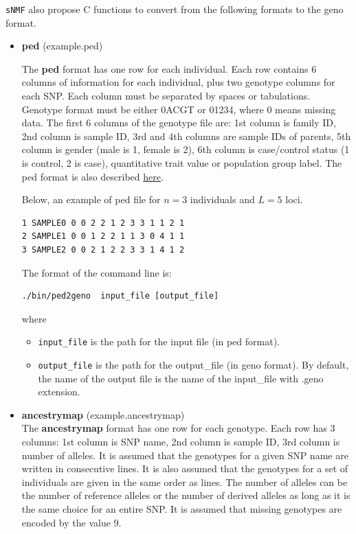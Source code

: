 \documentclass[10pt,a4paper]{article}
\begin{document}
\noindent
{\tt sNMF} also propose C functions to convert from the following formats to the geno format.
\begin{itemize}
\item {\bf ped} (example.ped)

The {\bf ped} format has one row for each individual. Each row contains 6 columns of information for each individual, plus two genotype columns for each SNP. Each column must be separated by spaces or tabulations. Genotype format must be either 0ACGT or 01234, where 0 means missing data. The first 6 columns of the genotype file are: 1st column is family ID, 2nd column is sample ID, 3rd and 4th columns are sample IDs of parents, 5th column is gender (male is 1, female is 2), 6th column is case/control status (1 is control, 2 is case), quantitative trait value or population group label. 
The ped format is also described \href{http://pngu.mgh.harvard.edu/~purcell/plink/data.shtml#ped}{here}.

Below, an example of ped file for $n=3$ individuals and $L=5$ loci.
\begin{center}
\footnotesize
\begin{Verbatim}[frame=single]
1 SAMPLE0 0 0 2 2 1 2 3 3 1 1 2 1
2 SAMPLE1 0 0 1 2 2 1 1 3 0 4 1 1
3 SAMPLE2 0 0 2 1 2 2 3 3 1 4 1 2
\end{Verbatim}
\end{center}

The format of the command line is:
\begin{Verbatim}[frame=single]
./bin/ped2geno  input_file [output_file]
\end{Verbatim}
where 
\begin{itemize}
\item \verb|input_file| is the path for the input file (in ped format).
\item \verb|output_file| is the path for the output\_file (in geno format). 
By default, the name of the output file is the name of the input\_file with .geno extension.

\end{itemize}

\item {\bf ancestrymap} (example.ancestrymap)\\
The {\bf ancestrymap} format has one row for each genotype. Each row has 3 columns: 1st column is SNP name, 2nd column is sample ID, 3rd column is number of alleles. It is assumed that the genotypes for a given SNP name are written in consecutive lines. It is also assumed that the genotypes for a set of individuals are given in the same order as lines. The number of alleles can be the number of reference alleles or the number of derived alleles as long as it is the same choice for an entire SNP. It is assumed that missing genotypes are encoded by the value 9.


\end{itemize}
\end{document}
